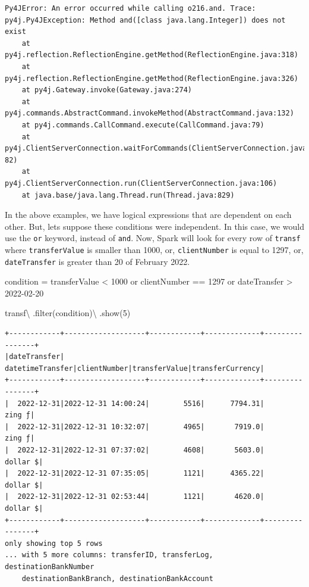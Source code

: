 \documentclass[
  11pt,
  letterpaper,
  DIV=11,
  numbers=noendperiod]{scrreprt}
\newenvironment{Shaded}{\begin{snugshade}}{\end{snugshade}}
\newcommand{\BuiltInTok}[1]{\textcolor[rgb]{0.00,0.23,0.31}{#1}}
\newcommand{\DecValTok}[1]{\textcolor[rgb]{0.68,0.00,0.00}{#1}}
\newcommand{\NormalTok}[1]{\textcolor[rgb]{0.00,0.23,0.31}{#1}}
\newcommand{\OperatorTok}[1]{\textcolor[rgb]{0.37,0.37,0.37}{#1}}
\newcommand{\StringTok}[1]{\textcolor[rgb]{0.13,0.47,0.30}{#1}}
\begin{document}
\begin{verbatim}
Py4JError: An error occurred while calling o216.and. Trace:
py4j.Py4JException: Method and([class java.lang.Integer]) does not exist
    at py4j.reflection.ReflectionEngine.getMethod(ReflectionEngine.java:318)
    at py4j.reflection.ReflectionEngine.getMethod(ReflectionEngine.java:326)
    at py4j.Gateway.invoke(Gateway.java:274)
    at py4j.commands.AbstractCommand.invokeMethod(AbstractCommand.java:132)
    at py4j.commands.CallCommand.execute(CallCommand.java:79)
    at py4j.ClientServerConnection.waitForCommands(ClientServerConnection.java:1
82)
    at py4j.ClientServerConnection.run(ClientServerConnection.java:106)
    at java.base/java.lang.Thread.run(Thread.java:829)
\end{verbatim}

In the above examples, we have logical expressions that are dependent on
each other. But, lets suppose these conditions were independent. In this
case, we would use the \texttt{or} keyword, instead of \texttt{and}.
Now, Spark will look for every row of \texttt{transf} where
\texttt{transferValue} is smaller than 1000, or, \texttt{clientNumber}
is equal to 1297, or, \texttt{dateTransfer} is greater than 20 of
February 2022.

\begin{Shaded}
\begin{Highlighting}[]
\NormalTok{condition }\OperatorTok{=} \StringTok{\textquotesingle{}\textquotesingle{}\textquotesingle{}}
\StringTok{  transferValue \textless{} 1000}
\StringTok{  or clientNumber == 1297 }
\StringTok{  or dateTransfer \textgreater{} \textquotesingle{}2022{-}02{-}20\textquotesingle{}}
\StringTok{\textquotesingle{}\textquotesingle{}\textquotesingle{}}

\NormalTok{transf}\OperatorTok{\textbackslash{}}
\NormalTok{  .}\BuiltInTok{filter}\NormalTok{(condition)}\OperatorTok{\textbackslash{}}
\NormalTok{  .show(}\DecValTok{5}\NormalTok{)}
\end{Highlighting}
\end{Shaded}

\begin{verbatim}
+------------+-------------------+------------+-------------+----------------+
|dateTransfer|   datetimeTransfer|clientNumber|transferValue|transferCurrency|
+------------+-------------------+------------+-------------+----------------+
|  2022-12-31|2022-12-31 14:00:24|        5516|      7794.31|          zing ƒ|
|  2022-12-31|2022-12-31 10:32:07|        4965|       7919.0|          zing ƒ|
|  2022-12-31|2022-12-31 07:37:02|        4608|       5603.0|        dollar $|
|  2022-12-31|2022-12-31 07:35:05|        1121|      4365.22|        dollar $|
|  2022-12-31|2022-12-31 02:53:44|        1121|       4620.0|        dollar $|
+------------+-------------------+------------+-------------+----------------+
only showing top 5 rows
... with 5 more columns: transferID, transferLog, destinationBankNumber
    destinationBankBranch, destinationBankAccount
\end{verbatim}
\end{document}
